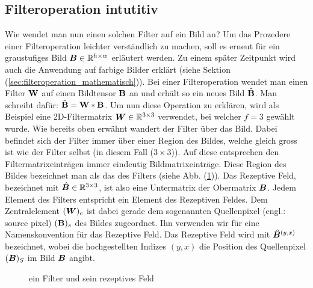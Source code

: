 \subsection{Filteroperation intutitiv}\label{sec:filteroperation_intuitiv}
Wie wendet man nun einen solchen Filter auf ein Bild an? Um das Prozedere einer
Filteroperation leichter verständlich zu machen, soll es erneut für ein
graustufiges Bild $\bm{B} \in \mathbb{R}^{h \times w}$ erläutert werden. Zu einem
später Zeitpunkt wird auch die Anwendung auf farbige
Bilder erklärt (siehe Sektion (\ref{sec:filteroperation_mathematisch})).
\para{}
Bei einer Filteroperation wendet man einen Filter $\mathbf{W}$ auf einen Bildtensor
$\mathbf{B}$ an und erhält so ein neues Bild $\tilde{\mathbf{B}}$. Man schreibt dafür:
$\tilde{\mathbf{B}} = \mathbf{W} * \mathbf{B}$.
\para{}
Um nun diese Operation zu erklären, wird als Beispiel eine
2D-Filtermatrix $\bm{W} \in \mathbb{R}^{3 \times 3}$ verwendet, bei welcher
$f = 3$ gewählt wurde.
Wie bereits oben erwähnt wandert der Filter über das Bild. Dabei befindet
sich der Filter immer über einer Region des Bildes, welche gleich gross ist
wie der Filter selbst (in diesem Fall ($3 \times 3$)). Auf diese entsprechen den Filtermatrixeinträgen immer eindeutig
Bildmatrixeinträge. Diese Region des Bildes bezeichnet man als das
 des Filters (siehe Abb. (\ref{fig:receptive_field})).
Das Rezeptive Feld, bezeichnet mit $\hat{\bm{B}} \in \mathbb{R}^{3 \times 3}$, ist also eine
Untermatrix der Obermatrix $\bm{B}$.
\para{}
Jedem Element des Filters entspricht ein Element des Rezeptiven Feldes. Dem
Zentralelement $(\bm{W})_c$ ist dabei gerade dem sogenannten Quellenpixel
(engl.: source pixel) $(\mathbf{B})_s$ des Bildes zugeordnet. Ihn verwenden wir für eine
Namenskonvention für das Rezeptive Feld. Das Rezeptive Feld wird mit
$\hat{\bm{B}}^{(y,x)}$ bezeichnet, wobei die hochgestellten Indizes $(y,x)$ die Position
des Quellenpixel $(\bm{B})_S$ im Bild $\bm{B}$ angibt.

\begin{figure}[h!]

  \caption{ein Filter und sein rezeptives Feld}
  \label{fig:receptive_field}
\end{figure}

